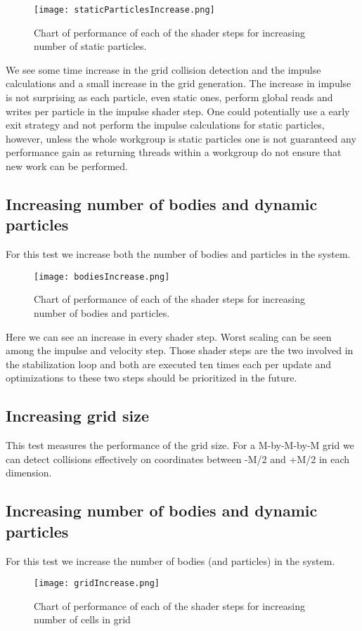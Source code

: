 \begin{figure}[H]
  \centering
  \texttt{[image: staticParticlesIncrease.png]}
  \caption{Chart of performance of each of the shader steps for increasing number of static particles.}
\end{figure}

We see some time increase in the grid collision detection and the impulse calculations
and a small increase in the grid generation.
The increase in impulse is not surprising as each particle, even static ones, perform
global reads and writes per particle in the impulse shader step. One could potentially
use a early exit strategy and not perform the impulse calculations for static particles,
however, unless the whole workgroup is static particles one is not guaranteed
any performance gain as returning threads within a workgroup do not ensure
that new work can be performed.

\subsection{Increasing number of bodies and dynamic particles}
For this test we increase both the number of bodies and particles in the system.
\begin{figure}[H]
  \centering
  \texttt{[image: bodiesIncrease.png]}
  \caption{Chart of performance of each of the shader steps for increasing number of bodies and particles.}
\end{figure}

Here we can see an increase in every shader step.
Worst scaling can be seen among the impulse and velocity step. Those shader steps are the two involved
in the stabilization loop and both are executed ten times each per update and optimizations
to these two steps should be prioritized in the future.

\subsection{Increasing grid size}
This test measures the performance of the grid size. For a M-by-M-by-M grid we can detect collisions
effectively on coordinates between -M/2 and +M/2 in each dimension.
\subsection{Increasing number of bodies and dynamic particles}
For this test we increase the number of bodies (and particles) in the system.
\begin{figure}[H]
  \centering
  \texttt{[image: gridIncrease.png]}
  \caption{Chart of performance of each of the shader steps for increasing number of cells in grid}
\end{figure}

